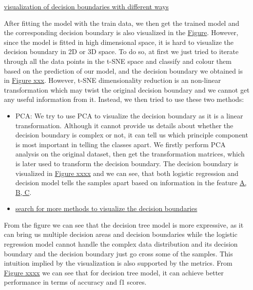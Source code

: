 \documentclass{article}
\begin{document}
\underline{visualization of decision boundaries with different ways}

After fitting the model with the train data, we then get the trained model and the corresponding decision boundary is also visualized in the \underline{Figure}. However, since the model is fitted in high dimensional space, it is hard to visualize the decision boundary in 2D or 3D space. To do so, at first we just tried to iterate through all the data points in the t-SNE space and classify and colour them based on the prediction of our model, and the decision boundary we obtained is in \underline{Figure xxx}. However, t-SNE dimensionality reduction is an non-linear transformation which may twist the original decision boundary and we cannot get any useful information from it. Instead, we then tried to use these two methods:

\begin{itemize}
    \item PCA: We try to use PCA to visualize the decision boundary as it is a linear transformation. Although it cannot provide us details about whether the decision boundary is complex or not, it can tell us which principle component is most important in telling the classes apart. We firstly perform PCA analysis on the original dataset, then get the transformation matrices, which is later used to transform the decision boundary. The decision boundary is visualized in \underline{Figure xxxx} and we can see, that both logistic regression and decision model tells the samples apart based on information in the feature \underline{A, B, C}. 
    \item \underline{search for more methods to visualize the decision boundaries}
\end{itemize}

From the figure we can see that the decision tree model is more expressive, as it can bring us multiple decision areas and decision boundaries while the logistic regression model cannot handle the complex data distribution and its decision boundary and the decision boundary just go cross some of the samples. 
This intuition implied by the visualization is also supported by the metrics. From \underline{Figure xxxx} we can see that for decision tree model, it can achieve better performance in terms of accuracy and f1 scores. 
\end{document}
